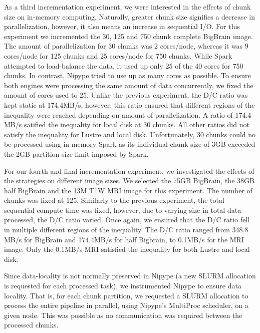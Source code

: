 \documentclass{IEEEtran}
\begin{document}
As a third incrementation experiment, we were interested in the effects of 
chunk size on in-memory computing. Naturally, greater chunk size signifies 
a decrease in parallelization, however, it also means an increase in sequential
I/O. For this experiment we incremented the 30, 125 and 750 chunk complete
BigBrain image. The amount of parallelization for 30 chunks was 2 cores/node, 
whereas it was 9 cores/node for 125 chunks and 25 cores/node for 750 chunks. 
While Spark attempted to load-balance the data, it used up only 25 of the 40 
cores for 750 chunks. In contrast, Nipype tried to use up as many cores as 
possible. To ensure both engines were processing the same amount of data 
concurrently, we fixed the amount of cores used to 25.
Unlike the previous experiment, the D/C ratio was kept static at 174.4MB/s, 
however, this ratio ensured that different regions of the inequality were 
reached depending on amount of parallelization. A ratio of 174.4 MB/s satified
the inequality for local disk at 30 chunks. All other ratios did not satisfy 
the inequality for Lustre and local disk. Unfortunately, 30 chunks could no be 
processed using in-memory Spark as its individual chunk size of 3GB exceeded 
the 2GB partition size limit imposed by Spark.

For our fourth and final incrementation experiment, we investigated the effects 
of the strategies on different image sizes. We selected the 75GB BigBrain, the
38GB half BigBrain and the 13M T1W MRI image for this experiment. The number of
chunks was fixed at 125. Similarly to the previous experiment, the total 
sequential compute time was fixed, however, due to varying size in total data 
processed, the D/C ratio varied. Once again, we ensured that the D/C ratio fell
in multiple different regions of the inequality. The D/C ratio ranged from 
348.8 MB/s for BigBrain and 174.4MB/s for half Bigbrain, to 0.1MB/s for the MRI 
image. Only the 0.1MB/s MRI satisfied the inequality for both Lustre and local 
disk.

Since data-locality is not normally preserved in Nipype (a new SLURM allocation 
is requested for each processed task), we instrumented Nipype to ensure data 
locality. That is, for each chunk partition, we requested a SLURM allocation to
process the entire pipeline in parallel, using Nipype's MultiProc scheduler, on 
a given node. This was possible as no communication was required between the 
processed chunks.



\end{document}
